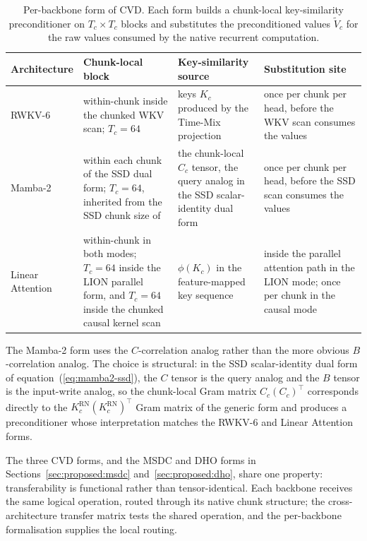 \begin{table}[t]
\centering
\small
\caption[Per-backbone form of Chunked Value
Decorrelation]{Per-backbone form of CVD. Each form builds a
chunk-local key-similarity preconditioner on $T_{c} \times T_{c}$
blocks and substitutes the preconditioned values
$\tilde{V}_{c}$ for the raw values consumed by the native
recurrent computation.}
\label{tab:cvd-deployment}
\setlength{\tabcolsep}{4pt}
\renewcommand{\arraystretch}{1.25}
\begin{tabularx}{\linewidth}{@{}p{2.4cm} X X X@{}}
\toprule
\textbf{Architecture} & \textbf{Chunk-local block} & \textbf{Key-similarity source} & \textbf{Substitution site} \\
\midrule
RWKV-6 &
within-chunk inside the chunked WKV scan; $T_{c} = 64$ &
keys $K_{c}$ produced by the Time-Mix projection &
once per chunk per head, before the WKV scan consumes the values \\
\addlinespace
Mamba-2 &
within each chunk of the SSD dual form; $T_{c} = 64$, inherited from the SSD chunk size of~\citet{dao2024transformers} &
the chunk-local $C_{c}$ tensor, the query analog in the SSD scalar-identity dual form &
once per chunk per head, before the SSD scan consumes the values \\
\addlinespace
\shortstack[l]{Linear\\Attention} &
within-chunk in both modes; $T_{c} = 64$ inside the LION parallel form, and $T_{c} = 64$ inside the chunked causal kernel scan &
$\phi(K_{c})$ in the feature-mapped key sequence &
inside the parallel attention path in the LION mode; once per chunk in the causal mode \\
\bottomrule
\end{tabularx}
\end{table}

The Mamba-2 form uses the $C$-correlation analog rather than the
more obvious $B$-correlation analog. The choice is structural: in
the SSD scalar-identity dual form of
equation~(\ref{eq:mamba2-ssd}), the $C$ tensor is the query analog
and the $B$ tensor is the input-write analog, so the chunk-local
Gram matrix $C_{c} (C_{c})^{\top}$ corresponds directly to the
$K_{c}^{\mathrm{RN}} (K_{c}^{\mathrm{RN}})^{\top}$ Gram matrix of
the generic form and produces a preconditioner whose
interpretation matches the RWKV-6 and Linear Attention forms.

The three CVD forms, and the MSDC and DHO forms in
Sections~\ref{sec:proposed:msdc} and~\ref{sec:proposed:dho},
share one property: transferability is functional rather than
tensor-identical. Each backbone receives the same logical
operation, routed through its native chunk structure; the
cross-architecture transfer matrix tests the shared operation,
and the per-backbone formalisation supplies the local routing.

